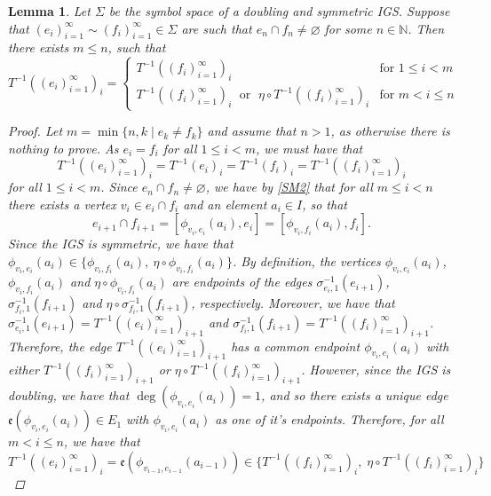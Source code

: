 \documentclass{amsart}
\newtheorem{lemma}[equation]{Lemma}
\numberwithin{equation}{section}
\theoremstyle{definition}
\theoremstyle{remark}
\newcommand{\N}{\mathbb{N}}
\begin{document}
\begin{lemma}\label{Lemma: Intersecting Sequences}
    Let \(\Sigma\) be the symbol space of a doubling and symmetric IGS. Suppose that \((e_i)_{i=1}^\infty
    \sim (f_i)_{i=1}^\infty\in \Sigma\) are such that \(e_{n}\cap f_{n}\neq \varnothing\) for some \(n\in\N\). Then there exists \(m\leq n\), such that 
        \[
            T^{-1}((e_i)_{i=1}^\infty)_i=
            \begin{cases}
                T^{-1}((f_i)_{i=1}^\infty)_i&\text{for } 1\leq i< m\\
                T^{-1}((f_i)_{i=1}^\infty)_i \;\text{ or }\; \eta\circ T^{-1}((f_i)_{i=1}^\infty)_i&\text{for }m< i\leq n
            \end{cases}
        \]
\begin{proof}
    Let \(m=\min\{n,k\mid e_k\neq f_k\}\) and assume that \(n>1\), as otherwise there is nothing to prove. As \(e_i=f_i\) for all \(1\leq i<m\), we must have that 
        \[
            T^{-1}((e_i)_{i=1}^\infty)_i=T^{-1}(e_i)_i=T^{-1}(f_i)_i=T^{-1}((f_i)_{i=1}^\infty)_i
        \]
    for all \(1\leq i <m\). Since \(e_n\cap f_n\neq\varnothing\), we have by \ref{SM2} that for all \(m\leq i< n\) there exists a vertex \(v_i\in e_i\cap f_i\) and an element \(a_i\in I\), so that 
        \[
            e_{i+1}\cap f_{i+1}=[\phi_{v_i,e_i}(a_i),e_i]=[\phi_{v_i,f_i}(a_i),f_i].
        \] 
    Since the IGS is symmetric, we have that \(\phi_{v_i,e_i}(a_i)\in\{\phi_{v_i,f_i}(a_i),\:\eta\circ \phi_{v_i,f_i}(a_i)\}\). By definition, the vertices \(\phi_{v_i,e_i}(a_i)\), \(\phi_{v_i,f_i}(a_i)\) and \(\eta\circ \phi_{v_i,f_i}(a_i)\) are endpoints of the edges \(\sigma_{e_i,1}^{-1}(e_{i+1})\), \(\sigma_{f_i,1}^{-1}(f_{i+1})\) and \(\eta\circ \sigma_{f_i,1}^{-1}(f_{i+1})\), respectively. Moreover, we have that \(\sigma_{e_i,1}^{-1}(e_{i+1})=T^{-1}((e_i)_{i=1}^\infty)_{i+1}\) and \(\sigma_{f_i,1}^{-1}(f_{i+1})=T^{-1}((f_i)_{i=1}^\infty)_{i+1}\). Therefore, the edge \(T^{-1}((e_i)_{i=1}^\infty)_{i+1}\) has a common endpoint \(\phi_{v_i,e_i}(a_i)\) with either \(T^{-1}((f_i)_{i=1}^\infty)_{i+1}\) or \(\eta\circ T^{-1}((f_i)_{i=1}^\infty)_{i+1}\). However, since the IGS is doubling, we have that \(\deg(\phi_{v_i,e_i}(a_i))=1\), and so there exists a unique edge \(\mathfrak{e}(\phi_{v_i,e_i}(a_i))\in E_1\) with \(\phi_{v_i,e_i}(a_i)\) as one of it's endpoints. Therefore, for all \(m<i\leq n\), we have that
        \[
            T^{-1}((e_i)_{i=1}^\infty)_{i}=\mathfrak{e}(\phi_{v_{i-1},e_{i-1}}(a_{i-1}))\in\{T^{-1}((f_i)_{i=1}^\infty)_{i},\;\eta\circ T^{-1}((f_i)_{i=1}^\infty)_{i}\}
        \]
\end{proof}
    

\end{lemma}
\end{document}
